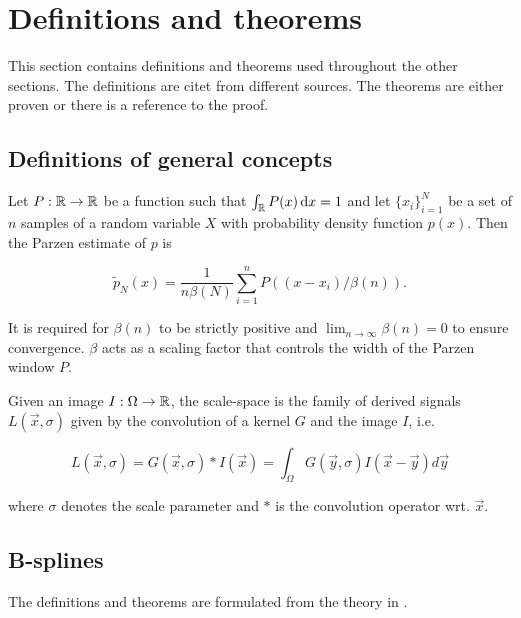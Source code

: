 
\chapter{Definitions and theorems}\label{chapter:defthm}

This section contains definitions and theorems used throughout the other sections. The definitions are citet from different sources. The theorems are either proven or there is a reference to the proof.\\

\section{Definitions of general concepts}
\begin{definition}\label{parzen}
Let $P:\mathbb R\to \mathbb R$ be a function such that $\int_\mathbb R P(x) \,{\rm d} x= 1$ and let $\{x_i\}_{i=1}^N$ be a set of $n$ samples of a random variable $X$ with probability density function $p(x)$. Then the Parzen estimate of $p$ is 

\begin{equation}
\tilde{p}_N(x) = \frac{1}{n\beta(N)}\sum_{i=1}^n P((x-x_i)/\beta(n)).
\end{equation}

It is required for $\beta(n)$ to be strictly positive and $\lim_{n\to\infty}\beta(n) = 0$ to ensure convergence. $\beta$ acts as a scaling factor that controls the width of the Parzen window $P$. \cite{the.00,parzen.62}
\end{definition}

\begin{definition}\label{scalespace}
Given an image $I:\Omega\to \mathbb R$, the scale-space is the family of derived signals $L(\vec{x},\sigma)$ given by the convolution of a kernel $G$ and the image $I$, i.e.

\begin{equation}
L(\vec{x},\sigma) = G(\vec{x},\sigma)*I(\vec{x}) = \int_{\Omega} G(\vec{y},\sigma)I(\vec{x}-\vec{y})d\vec{y}
\end{equation}

where $\sigma$ denotes the scale parameter and $*$ is the convolution operator wrt. $\vec{x}$.
\end{definition}

\section{B-splines}
The definitions and theorems are formulated from the theory in \cite[chap.~6.5]{kin.02}.\\

